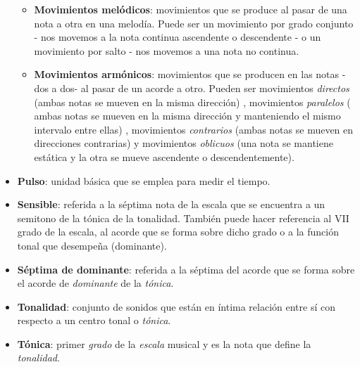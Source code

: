\begin{itemize}[label={}, leftmargin=*]
	\begin{itemize}

		\item \textbf{Movimientos melódicos}: movimientos que se produce al pasar de una nota a otra en una melodía. Puede ser un movimiento por grado conjunto - nos movemos a la nota continua ascendente o descendente - o un movimiento por salto - nos movemos a una nota no continua.

		\item \textbf{Movimientos armónicos}: movimientos que se producen en las notas -dos a dos- al pasar de un acorde a otro. Pueden ser movimientos \textit{directos} (ambas notas se mueven en la misma dirección) , movimientos \textit{paralelos} ( ambas notas se mueven en la misma dirección y manteniendo el mismo intervalo entre ellas) , movimientos \textit{contrarios} (ambas notas se mueven en direcciones contrarias) y movimientos \textit{oblicuos} (una nota se mantiene estática y la otra se mueve ascendente o descendentemente).

	\end{itemize}

	\item \textbf{Pulso}: unidad básica que se emplea para medir el tiempo.

	\bigskip

	\item \textbf{Sensible}: referida a la séptima nota de la escala que se encuentra a un semitono de la tónica de la tonalidad. También puede hacer referencia al VII grado de la escala, al acorde que se forma sobre dicho grado o a la función tonal que desempeña (dominante). 

	\bigskip

	\item \textbf{Séptima de dominante}: referida a la séptima del acorde que se forma sobre el acorde de \textit{dominante} de la \textit{tónica}.

	\bigskip

	\item \textbf{Tonalidad}: conjunto de sonidos que están en íntima relación entre sí con respecto a un centro tonal o \textit{tónica}.

	\bigskip

	\item \textbf{Tónica}: primer \textit{grado} de la \textit{escala} musical y es la nota que define la \textit{tonalidad}. 

\end{itemize}